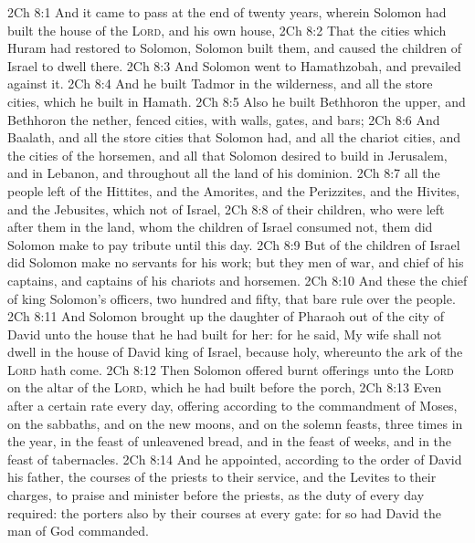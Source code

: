 \vs 2Ch 8:1 And it came to pass at the end of twenty years, wherein Solomon had built the house of the \textsc{Lord}, and his own house,
\vs 2Ch 8:2 That the cities which Huram had restored to Solomon, Solomon built them, and caused the children of Israel to dwell there.
\vs 2Ch 8:3 And Solomon went to Hamathzobah, and prevailed against it.
\vs 2Ch 8:4 And he built Tadmor in the wilderness, and all the store cities, which he built in Hamath.
\vs 2Ch 8:5 Also he built Bethhoron the upper, and Bethhoron the nether, fenced cities, with walls, gates, and bars;
\vs 2Ch 8:6 And Baalath, and all the store cities that Solomon had, and all the chariot cities, and the cities of the horsemen, and all that Solomon desired to build in Jerusalem, and in Lebanon, and throughout all the land of his dominion.
\vs 2Ch 8:7  all the people  left of the Hittites, and the Amorites, and the Perizzites, and the Hivites, and the Jebusites, which  not of Israel,
\vs 2Ch 8:8  of their children, who were left after them in the land, whom the children of Israel consumed not, them did Solomon make to pay tribute until this day.
\vs 2Ch 8:9 But of the children of Israel did Solomon make no servants for his work; but they  men of war, and chief of his captains, and captains of his chariots and horsemen.
\vs 2Ch 8:10 And these  the chief of king Solomon's officers,  two hundred and fifty, that bare rule over the people.
\vs 2Ch 8:11 And Solomon brought up the daughter of Pharaoh out of the city of David unto the house that he had built for her: for he said, My wife shall not dwell in the house of David king of Israel, because  holy, whereunto the ark of the \textsc{Lord} hath come.
\vs 2Ch 8:12 Then Solomon offered burnt offerings unto the \textsc{Lord} on the altar of the \textsc{Lord}, which he had built before the porch,
\vs 2Ch 8:13 Even after a certain rate every day, offering according to the commandment of Moses, on the sabbaths, and on the new moons, and on the solemn feasts, three times in the year,  in the feast of unleavened bread, and in the feast of weeks, and in the feast of tabernacles.
\vs 2Ch 8:14 And he appointed, according to the order of David his father, the courses of the priests to their service, and the Levites to their charges, to praise and minister before the priests, as the duty of every day required: the porters also by their courses at every gate: for so had David the man of God commanded.

